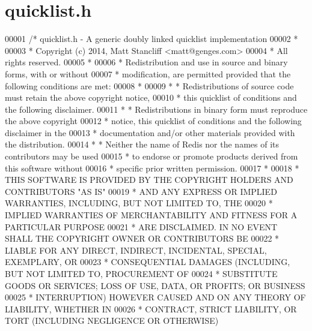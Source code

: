 \hypertarget{quicklist_8h_source}{}\section{quicklist.\+h}
\label{quicklist_8h_source}

\begin{DoxyCode}
00001 \textcolor{comment}{/* quicklist.h - A generic doubly linked quicklist implementation}
00002 \textcolor{comment}{ *}
00003 \textcolor{comment}{ * Copyright (c) 2014, Matt Stancliff <matt@genges.com>}
00004 \textcolor{comment}{ * All rights reserved.}
00005 \textcolor{comment}{ *}
00006 \textcolor{comment}{ * Redistribution and use in source and binary forms, with or without}
00007 \textcolor{comment}{ * modification, are permitted provided that the following conditions are met:}
00008 \textcolor{comment}{ *}
00009 \textcolor{comment}{ *   * Redistributions of source code must retain the above copyright notice,}
00010 \textcolor{comment}{ *     this quicklist of conditions and the following disclaimer.}
00011 \textcolor{comment}{ *   * Redistributions in binary form must reproduce the above copyright}
00012 \textcolor{comment}{ *     notice, this quicklist of conditions and the following disclaimer in the}
00013 \textcolor{comment}{ *     documentation and/or other materials provided with the distribution.}
00014 \textcolor{comment}{ *   * Neither the name of Redis nor the names of its contributors may be used}
00015 \textcolor{comment}{ *     to endorse or promote products derived from this software without}
00016 \textcolor{comment}{ *     specific prior written permission.}
00017 \textcolor{comment}{ *}
00018 \textcolor{comment}{ * THIS SOFTWARE IS PROVIDED BY THE COPYRIGHT HOLDERS AND CONTRIBUTORS "AS IS"}
00019 \textcolor{comment}{ * AND ANY EXPRESS OR IMPLIED WARRANTIES, INCLUDING, BUT NOT LIMITED TO, THE}
00020 \textcolor{comment}{ * IMPLIED WARRANTIES OF MERCHANTABILITY AND FITNESS FOR A PARTICULAR PURPOSE}
00021 \textcolor{comment}{ * ARE DISCLAIMED. IN NO EVENT SHALL THE COPYRIGHT OWNER OR CONTRIBUTORS BE}
00022 \textcolor{comment}{ * LIABLE FOR ANY DIRECT, INDIRECT, INCIDENTAL, SPECIAL, EXEMPLARY, OR}
00023 \textcolor{comment}{ * CONSEQUENTIAL DAMAGES (INCLUDING, BUT NOT LIMITED TO, PROCUREMENT OF}
00024 \textcolor{comment}{ * SUBSTITUTE GOODS OR SERVICES; LOSS OF USE, DATA, OR PROFITS; OR BUSINESS}
00025 \textcolor{comment}{ * INTERRUPTION) HOWEVER CAUSED AND ON ANY THEORY OF LIABILITY, WHETHER IN}
00026 \textcolor{comment}{ * CONTRACT, STRICT LIABILITY, OR TORT (INCLUDING NEGLIGENCE OR OTHERWISE)}

\end{DoxyCode}
